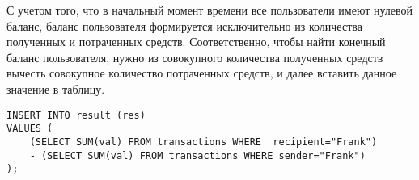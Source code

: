 \solutionSection

С учетом того, что в начальный момент времени все пользователи имеют нулевой баланс, баланс пользователя формируется исключительно из количества полученных и потраченных средств.
Соответственно, чтобы найти конечный баланс пользователя, нужно из совокупного количества полученных средств вычесть совокупное количество потраченных средств, и далее вставить данное значение в таблицу.

\begin{verbatim}
INSERT INTO result (res)
VALUES (
    (SELECT SUM(val) FROM transactions WHERE  recipient="Frank")
    - (SELECT SUM(val) FROM transactions WHERE sender="Frank")
);
\end{verbatim}

\codeExample

